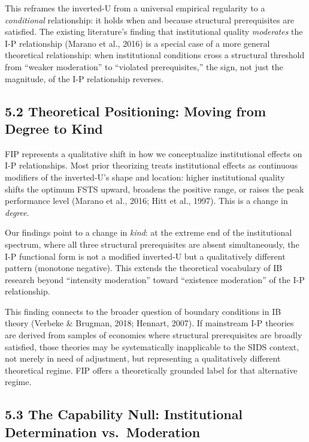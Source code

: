 \documentclass[
  12pt]{article}
\begin{document}
This reframes the inverted-U from a universal empirical regularity to a
\emph{conditional} relationship: it holds when and because structural
prerequisites are satisfied. The existing literature's finding that
institutional quality \emph{moderates} the I-P relationship (Marano et
al., 2016) is a special case of a more general theoretical relationship:
when institutional conditions cross a structural threshold from ``weaker
moderation'' to ``violated prerequisites,'' the sign, not just the
magnitude, of the I-P relationship reverses.

\hypertarget{theoretical-positioning-moving-from-degree-to-kind}{%
\subsection{5.2 Theoretical Positioning: Moving from Degree to
Kind}\label{theoretical-positioning-moving-from-degree-to-kind}}

FIP represents a qualitative shift in how we conceptualize institutional
effects on I-P relationships. Most prior theorizing treats institutional
effects as continuous modifiers of the inverted-U's shape and location:
higher institutional quality shifts the optimum FSTS upward, broadens
the positive range, or raises the peak performance level (Marano et al.,
2016; Hitt et al., 1997). This is a change in \emph{degree}.

Our findings point to a change in \emph{kind}: at the extreme end of the
institutional spectrum, where all three structural prerequisites are
absent simultaneously, the I-P functional form is not a modified
inverted-U but a qualitatively different pattern (monotone negative).
This extends the theoretical vocabulary of IB research beyond
``intensity moderation'' toward ``existence moderation'' of the I-P
relationship.

This finding connects to the broader question of boundary conditions in
IB theory (Verbeke \& Brugman, 2018; Hennart, 2007). If mainstream I-P
theories are derived from samples of economies where structural
prerequisites are broadly satisfied, those theories may be
systematically inapplicable to the SIDS context, not merely in need of
adjustment, but representing a qualitatively different theoretical
regime. FIP offers a theoretically grounded label for that alternative
regime.

\hypertarget{the-capability-null-institutional-determination-vs.-moderation}{%
\subsection{5.3 The Capability Null: Institutional Determination
vs.~Moderation}\label{the-capability-null-institutional-determination-vs.-moderation}}
\end{document}

